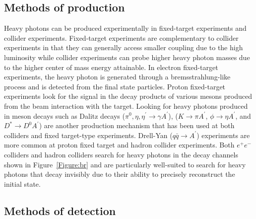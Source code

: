 \subsection{Methods of production}
Heavy photons can be produced experimentally in fixed-target experiments and collider experiments. Fixed-target experiments are complementary to collider experiments in that they can generally access smaller coupling due to the high luminosity while collider experiments can probe higher heavy photon masses due to the higher center of mass energy attainable. In electron fixed-target experiments, the heavy photon is generated through a bremsstrahlung-like process and is detected from the final state particles. Proton fixed-target experiments look for the signal in the decay products of various mesons produced from the beam interaction with the target. Looking for heavy photons produced in meson decays such as Dalitz decays ($\pi^0, \eta, \eta^{\prime}\rightarrow \gamma A^{\prime}$), ($K\rightarrow\pi A^{\prime} $, $\phi\rightarrow\eta A^{\prime}$, and $D^{\ast}\rightarrow D^{0}A^{\prime}$) are another production mechanism that has been used at both colliders and fixed target-type experiments. Drell-Yan ($q\bar{q}\rightarrow A^{\prime}$) experiments are more common at proton fixed target and hadron collider experiments. Both $e^+e^-$ colliders and hadron colliders search for heavy photons in the decay channels shown in Figure~\ref{Figure:br} and are particularly well-suited to search for heavy photons that decay invisibly due to their ability to precisely reconstruct the initial state. 

\subsection{Methods of detection}


